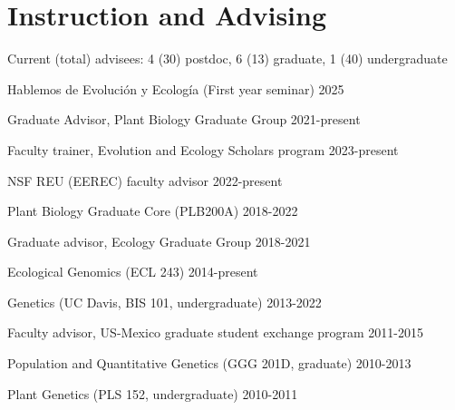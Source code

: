 \documentclass[letterpaper,10pt]{article}
\renewenvironment{itemize}{
  \begin{list}{}{
    \setlength{\leftmargin}{1.5em}
  }
}{
  \end{list}
}
\begin{document}
\section*{Instruction and Advising}
\begin{itemize}
\setlength\itemsep{0ex}
\item Current (total) advisees: 4 (30) postdoc, 6 (13) graduate, 1 (40) undergraduate 


\item Hablemos de Evoluci\'on y Ecolog\'ia (First year seminar) \hfill 2025
\item Graduate Advisor, Plant Biology Graduate Group \hfill 2021-present
\item Faculty trainer, Evolution and Ecology Scholars program \hfill 2023-present
\item NSF REU (EEREC) faculty advisor \hfill 2022-present
\item Plant Biology Graduate Core (PLB200A) \hfill 2018-2022
\item Graduate advisor, Ecology Graduate Group \hfill 2018-2021
\item Ecological Genomics (ECL 243) \hfill 2014-present
\item Genetics (UC Davis, BIS 101, undergraduate) \hfill 2013-2022
\item Faculty advisor, US-Mexico graduate student exchange program \hfill 2011-2015
\item Population and Quantitative Genetics (GGG 201D, graduate) \hfill2010-2013 %
\item Plant Genetics (PLS 152, undergraduate) \hfill 2010-2011 %

\end{itemize}
\end{document}
